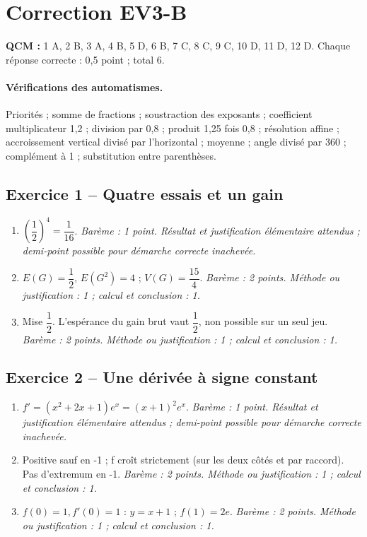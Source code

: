 \mxnewpage\section*{Correction EV3-B}\label{EV3-B-CORR}
\textbf{QCM :} 1 A, 2 B, 3 A, 4 B, 5 D, 6 B, 7 C, 8 C, 9 C, 10 D, 11 D, 12 D. Chaque réponse correcte : 0{,}5 point ; total 6.
\paragraph{Vérifications des automatismes.} Priorités ; somme de fractions ; soustraction des exposants ; coefficient multiplicateur 1{,}2 ; division par 0{,}8 ; produit 1{,}25 fois 0{,}8 ; résolution affine ; accroissement vertical divisé par l’horizontal ; moyenne ; angle divisé par 360 ; complément à 1 ; substitution entre parenthèses.
\subsection*{Exercice 1 -- Quatre essais et un gain}
\begin{enumerate}
\item $(\dfrac{1}{2})^4=\dfrac{1}{16}$. \textit{Barème : 1 point. Résultat et justification élémentaire attendus ; demi-point possible pour démarche correcte inachevée.}
\item $E(G)=\dfrac{1}{2}$, $E(G^2)=4$ ; $V(G)=\dfrac{15}{4}$. \textit{Barème : 2 points. Méthode ou justification : 1 ; calcul et conclusion : 1.}
\item Mise $\dfrac{1}{2}$. L’espérance du gain brut vaut $\dfrac{1}{2}$, non possible sur un seul jeu. \textit{Barème : 2 points. Méthode ou justification : 1 ; calcul et conclusion : 1.}
\end{enumerate}
\subsection*{Exercice 2 -- Une dérivée à signe constant}
\begin{enumerate}
\item $f\prime=(x^2+2x+1)e^x=(x+1)^2e^x$. \textit{Barème : 1 point. Résultat et justification élémentaire attendus ; demi-point possible pour démarche correcte inachevée.}
\item Positive sauf en -1 ; f croît strictement (sur les deux côtés et par raccord). Pas d’extremum en -1. \textit{Barème : 2 points. Méthode ou justification : 1 ; calcul et conclusion : 1.}
\item $f(0)=1,f\prime(0)=1$ : $y=x+1$ ; $f(1)=2e$. \textit{Barème : 2 points. Méthode ou justification : 1 ; calcul et conclusion : 1.}
\end{enumerate}
